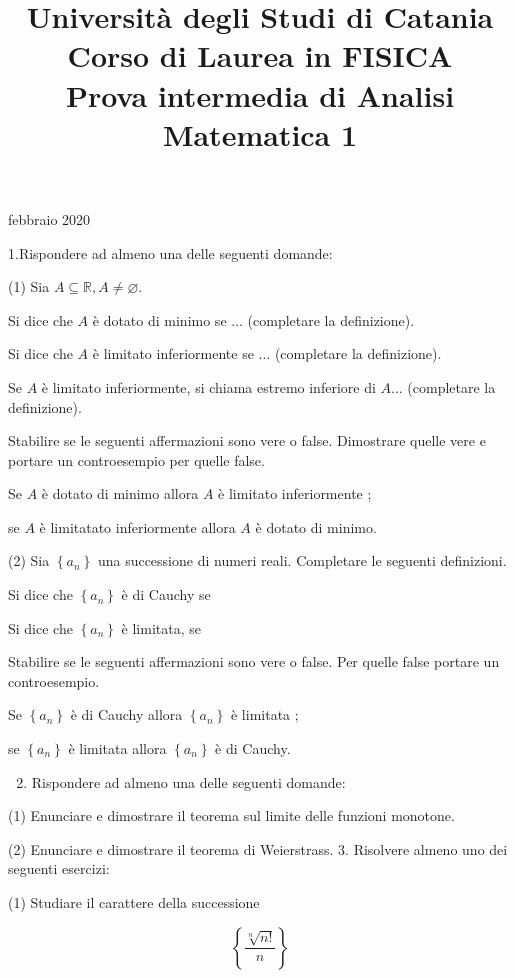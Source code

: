 \documentclass[10pt]{article}
\title{Università degli Studi di Catania \\ Corso di Laurea in FISICA \\ Prova intermedia di Analisi Matematica 1 }
\author{}
\date{}
\begin{document}
 febbraio 2020

1.Rispondere ad almeno una delle seguenti domande:

(1) Sia \(A \subseteq \mathbb{R}, A \neq \varnothing\).

Si dice che \(A\) è dotato di minimo se ... (completare la definizione).

Si dice che \(A\) è limitato inferiormente se ... (completare la definizione).

Se \(A\) è limitato inferiormente, si chiama estremo inferiore di \(A\)... (completare la definizione).

Stabilire se le seguenti affermazioni sono vere o false. Dimostrare quelle vere e portare un controesempio per quelle false.

Se \(A\) è dotato di minimo allora \(A\) è limitato inferiormente ;

se \(A\) è limitatato inferiormente allora \(A\) è dotato di minimo.

(2) Sia \(\left\{a_{n}\right\}\) una successione di numeri reali. Completare le seguenti definizioni.

Si dice che \(\left\{a_{n}\right\}\) è di Cauchy se

Si dice che \(\left\{a_{n}\right\}\) è limitata, se

Stabilire se le seguenti affermazioni sono vere o false. Per quelle false portare un controesempio.

Se \(\left\{a_{n}\right\}\) è di Cauchy allora \(\left\{a_{n}\right\}\) è limitata ;

se \(\left\{a_{n}\right\}\) è limitata allora \(\left\{a_{n}\right\}\) è di Cauchy.

\begin{enumerate}
  \setcounter{enumi}{1}
  \item Rispondere ad almeno una delle seguenti domande:
\end{enumerate}

(1) Enunciare e dimostrare il teorema sul limite delle funzioni monotone.

(2) Enunciare e dimostrare il teorema di Weierstrass. 3. Risolvere almeno uno dei seguenti esercizi:

(1) Studiare il carattere della successione

\[
\left\{\frac{\sqrt[n]{n !}}{n}\right\}
\]
\end{document}
